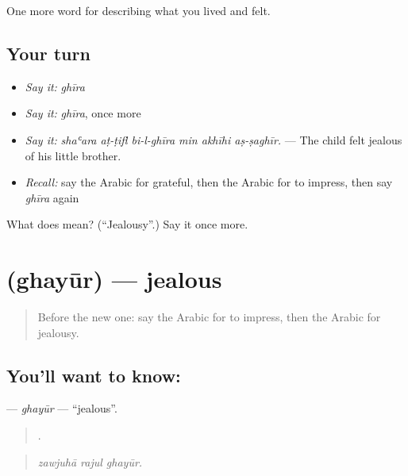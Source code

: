 \begin{grammarlens}[title={What you've built}]
One more word for describing what you lived and felt.
\end{grammarlens}

\subsection*{Your turn}
\begin{itemize}
\raggedright
  \item \emph{Say it:} \emph{ghīra}
  \item \emph{Say it:} \emph{ghīra}, once more
  \item \emph{Say it:} \emph{shaʿara aṭ-ṭifl bi-l-ghīra min akhīhi aṣ-ṣaghīr.} — The child felt jealous of his little brother.
  \item \emph{Recall:} say the Arabic for grateful, then the Arabic for to impress, then say \emph{ghīra} again
\end{itemize}

\begin{tcolorbox}[breakable,colback=teal!4,colframe=teal!35!black,title={Before you move on}]
What does  mean? (\textquotedblleft{}Jealousy\textquotedblright{}.) Say it once more.
\end{tcolorbox}
\section[\texorpdfstring{\ar{غيور} (ghayūr)}{غيور (ghayūr)}]{ (ghayūr) — jealous}

\label{lesson:AR-C492-ghayur}



\begin{quote}
Before the new one: say the Arabic for to impress, then the Arabic for jealousy.
\end{quote}

\subsection*{You'll want to know: }
\textbf{} — \emph{ghayūr} — \textquotedblleft{}jealous\textquotedblright{}.

\begin{quote}
  .
\end{quote}

\begin{quote}
\emph{zawjuhā rajul ghayūr.}
\end{quote}

